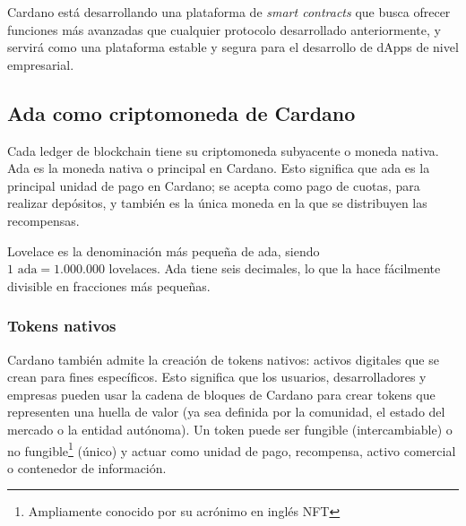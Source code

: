 \documentclass[12pt]{book}
\begin{document}
Cardano está desarrollando una plataforma de \textit{smart contracts} que busca ofrecer funciones más avanzadas que cualquier protocolo desarrollado anteriormente, y servirá como una plataforma estable y segura para el desarrollo de dApps de nivel empresarial.

\subsection{Ada como criptomoneda de Cardano}


Cada ledger de blockchain tiene su criptomoneda subyacente o moneda nativa. Ada es la moneda nativa o principal en Cardano. Esto significa que ada es la principal unidad de pago en Cardano; se acepta como pago de cuotas, para realizar depósitos, y también es la única moneda en la que se distribuyen las recompensas.

Lovelace es la denominación más pequeña de ada, siendo $1 \text{ ada} = 1.000.000 \text{ lovelaces}$. Ada tiene seis decimales, lo que la hace fácilmente divisible en fracciones más pequeñas.

\subsubsection{Tokens nativos}

Cardano también admite la creación de tokens nativos: activos digitales que se crean para fines específicos. Esto significa que los usuarios, desarrolladores y empresas pueden usar la cadena de bloques de Cardano para crear tokens que representen una huella de valor (ya sea definida por la comunidad, el estado del mercado o la entidad autónoma). Un token puede ser fungible (intercambiable) o no fungible\footnote{Ampliamente conocido por su acrónimo en inglés NFT} (único) y actuar como unidad de pago, recompensa, activo comercial o contenedor de información.



\end{document}
